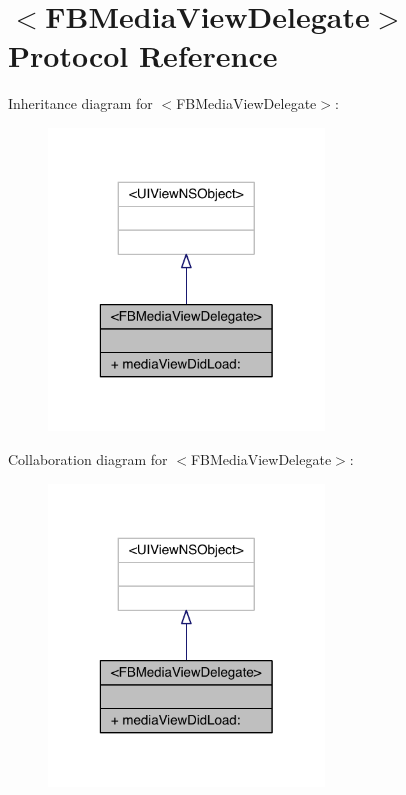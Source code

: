 \hypertarget{protocol_f_b_media_view_delegate-p}{\section{$<$F\-B\-Media\-View\-Delegate$>$ Protocol Reference}
\label{protocol_f_b_media_view_delegate-p}
}


Inheritance diagram for $<$F\-B\-Media\-View\-Delegate$>$\-:
\nopagebreak
\begin{figure}[H]
\begin{center}
\leavevmode
\includegraphics[width=208pt]{protocol_f_b_media_view_delegate-p__inherit__graph}
\end{center}
\end{figure}


Collaboration diagram for $<$F\-B\-Media\-View\-Delegate$>$\-:
\nopagebreak
\begin{figure}[H]
\begin{center}
\leavevmode
\includegraphics[width=208pt]{protocol_f_b_media_view_delegate-p__coll__graph}
\end{center}
\end{figure}
